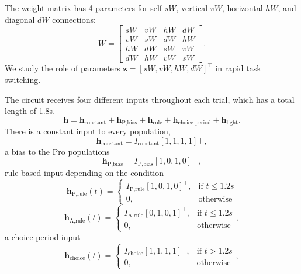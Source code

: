 \documentclass[11pt]{article}
\begin{document}
The weight matrix has 4 parameters for self $sW$, vertical $vW$, horizontal $hW$, and diagonal $dW$ connections:
\begin{equation}
W = \begin{bmatrix} sW & vW & hW & dW \\ vW & sW & dW  & hW \\ hW & dW & sW & vW \\ dW  & hW & vW  & sW \end{bmatrix}.
\end{equation}
We study the role of parameters $\mathbf{z} = [sW, vW, hW, dW]^\top$ in rapid task switching.

The circuit receives four different inputs throughout each trial, which has a total length of 1.8s.
\begin{equation}
\mathbf{h} = \mathbf{h}_{\text{constant}}  + \mathbf{h}_{\text{P,bias}} + \mathbf{h}_{\text{rule}} +  \mathbf{h}_{\text{choice-period}} + \mathbf{h}_{\text{light}}.
\end{equation}
There is a constant input to every population,
\begin{equation}\mathbf{h}_{\text{constant}} = I_{\text{constant}} [1, 1, 1, 1]\top,
\end{equation}
 a bias to the Pro populations
\begin{equation}\mathbf{h}_{\text{P,bias}} = I_{\text{P,bias}} [1, 0, 1, 0]\top,
\end{equation}
rule-based input depending on the condition
\begin{equation}\mathbf{h}_{\text{P,rule}}(t) = \begin{cases}
                           I_{\text{P,rule}} [1, 0, 1, 0]^\top,& \text{if } t\leq 1.2s \\
                            0,              & \text{otherwise}
                         \end{cases}
\end{equation}
\begin{equation} \mathbf{h}_{\text{A,rule}}(t) = \begin{cases}
                           I_{\text{A,rule}} [0, 1, 0, 1]^\top,& \text{if } t\leq 1.2s \\
                            0,              & \text{otherwise}
                         \end{cases},
\end{equation}
a choice-period input
\begin{equation} \mathbf{h}_{\text{choice}}(t) = \begin{cases}
                           I_{\text{choice}} [1, 1, 1, 1]^\top,& \text{if } t > 1.2s \\
                            0,              & \text{otherwise}
                         \end{cases},
\end{equation}
\end{document}
